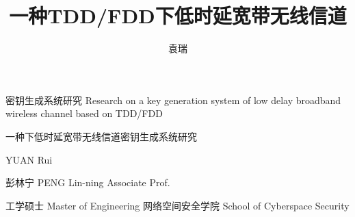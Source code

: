 \documentclass[figurelist,tablelist,nocolorlinks]{seumasterthesis}
\begin{document}

\title
    {一种TDD/FDD下低时延宽带无线信道}                                      %
    {密钥生成系统研究}                                          %
    {Research on a key generation}  %
    {system of low delay broadband wireless channel based on TDD/FDD}            %

\spine
    {一种下低时延宽带无线信道密钥生成系统研究}      %
    {}                                                          %

\author
    {袁瑞}                        %
    {YUAN Rui}                 %

\advisor
    {彭林宁}                       %
    {PENG Lin-ning}           %
    {Associate Prof.}                     %


\degreetype                     %
    {工学硕士}
    {Master of Engineering}
\submajor{}               %
\department                     %
    {网络空间安全学院}
    {School of Cyberspace Security}
\end{document}
